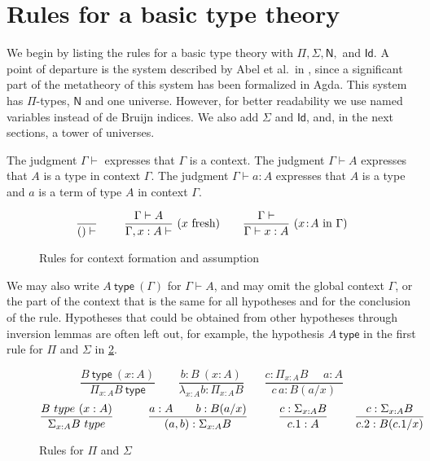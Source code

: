 \documentclass[a4paper,UKenglish,cleveref, autoref, thm-restate]{lipics-v2021}
\newcommand{\Id}{\mathsf{Id}}
\newcommand{\NN}{\mathsf{N}}
\newcommand{\type}{\mathsf{type}}
\newcommand{\mylam}[3]{\lambda_{#1:#2}#3}
\newcommand{\mypi}[3]{\Pi_{#1:#2}#3}
\newcommand{\mysig}[3]{\Sigma_{#1:#2}#3}
\newcommand{\app}[2]{{#1\,#2}} %
\begin{document}
\section{Rules for a basic type theory}\label{sec:basic}

We begin by listing the rules for a basic type theory
with $\Pi, \Sigma, \NN,$ and $\Id$. A point of departure is
the system described by Abel et al.\ in \cite{abel18}, since a
significant part of the metatheory of this system has been formalized in Agda.
This system has $\Pi$-types, $\NN$ and one universe.
However, for better readability we use named variables instead
of de Bruijn indices. We also add $\Sigma$ and $\Id$, and,
in the next sections, a tower of universes.

The judgment $\Gamma\vdash$ expresses that $\Gamma$ is a context.
The judgment $\Gamma\vdash A$ expresses that $A$ is a type in context $\Gamma$.
The judgment $\Gamma\vdash a:A$ expresses that $A$ is a type
and $a$ is a term of type $A$ in context $\Gamma$.

\begin{figure}[h]
  \caption{Rules for context formation and assumption}\label{fig:context}
$$
\frac{}{()\vdash}~~~~~~~
\frac{\Gamma\vdash A}{\Gamma,x:A\vdash}~(x~\text{fresh})~~~~~~
\frac{\Gamma\vdash}{\Gamma\vdash x:A}~(x\!:\! A~\text{in}~\Gamma)
\belowdisplayshortskip 0pt
$$
\end{figure}

We may also write $A~\type~(\Gamma)$ for $\Gamma\vdash A$,
and may omit the global context $\Gamma$,
or the part of the context that is the same for all hypotheses and for the
conclusion of the rule.
Hypotheses that could be obtained from other
hypotheses through inversion lemmas are often left out,
for example, the hypothesis $A~\type$ in the first rule for $\Pi$ and $\Sigma$
in \cref{fig:PiSig}.

\begin{figure}[h]
  \caption{Rules for $\Pi$ and $\Sigma$}\label{fig:PiSig}
$$
\frac{B~\type~(x:A)}{\mypi{x}{A}{B}~\type}~~~~~~~~~
\frac{b:B~(x:A)}{\mylam{x}{A}{b}:\mypi{x}{A}{B}}~~~~~~~~
\frac{c:\mypi{x}{A}{B}~~~~~~a:A}
     {\app{c}{a}:B(a/x)}
$$
$$
\frac{B~\type~(x:A)}{\mysig{x}{A}{B}~\type}~~~~~~~~~
\frac{a:A~~~~~~b:B(a/x)}{(a,b):\mysig{x}{A}{B}}~~~~~~~~
\frac{c:\mysig{x}{A}{B}}{c.1:A}~~~~~~~
\frac{c:\mysig{x}{A}{B}}{c.2:B(c.1/x)}
\belowdisplayshortskip -1pt
$$
\end{figure}
\end{document}

